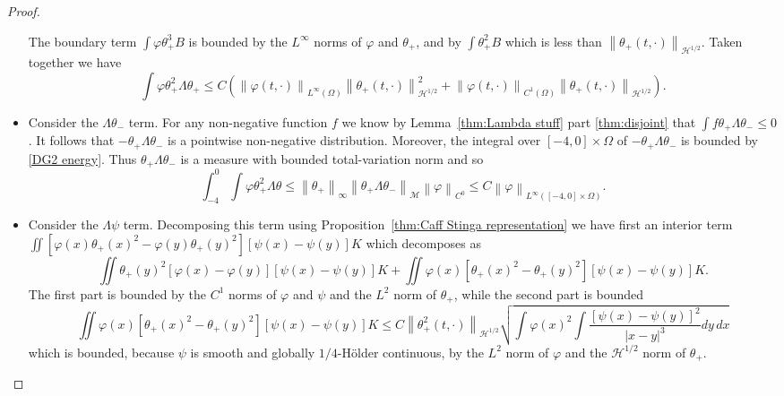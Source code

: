 \documentclass[11pt]{amsart}
\theoremstyle{remark}
\theoremstyle{definition}
\newcommand{\norm}[1]{\left\lVert#1\right\rVert}
\newcommand{\paren}[1]{\left( #1 \right)}
\newcommand{\HD}{\mathcal{H}}
\begin{document}
\begin{proof}
\begin{itemize}
The boundary term $\int \varphi \theta_+^3 B$ is bounded by the $L^\infty$ norms of $\varphi$ and $\theta_+$, and by $\int \theta_+^2 B$ which is less than $\norm{\theta_+(t,\cdot)}_{\HD^{1/2}}$.  Taken together we have
\[ \int \varphi \theta_+^2 \Lambda \theta_+ \leq C \paren{ \norm{\varphi(t,\cdot)}_{L^\infty(\Omega)} \norm{\theta_+(t,\cdot)}_{\HD^{1/2}}^2 + \norm{\varphi(t,\cdot)}_{C^1(\Omega)} \norm{\theta_+(t,\cdot)}_{\HD^{1/2}} }. \]

\item Consider the $\Lambda\theta_-$ term.  For any non-negative function $f$ we know by Lemma~\ref{thm:Lambda stuff} part \eqref{thm:disjoint} that $\int f \theta_+ \Lambda \theta_- \leq 0$.  
It follows that $-\theta_+ \Lambda \theta_-$ is a pointwise non-negative distribution.  Moreover, the integral over $[-4,0]\times\Omega$ of $-\theta_+\Lambda\theta_-$ is bounded by \eqref{DG2 energy}.  Thus $\theta_+\Lambda\theta_-$ is a measure with bounded total-variation norm and so
\[ \int_{-4}^0 \int \varphi \theta_+^2 \Lambda \theta \leq \norm{\theta_+}_\infty \norm{\theta_+\Lambda\theta_-}_{\mathcal{M}} \norm{\varphi}_{C^0} \leq C \norm{\varphi}_{L^\infty([-4,0]\times\Omega)}. \]

\item Consider the $\Lambda \psi$ term.  Decomposing this term using Proposition~\ref{thm:Caff Stinga representation} we have first an interior term $\iint [\varphi(x) \theta_+(x)^2 - \varphi(y) \theta_+(y)^2][\psi(x)-\psi(y)] K$ which decomposes as
\[ \iint \theta_+(y)^2[\varphi(x) - \varphi(y)][\psi(x)-\psi(y)] K + \iint \varphi(x) [\theta_+(x)^2 - \theta_+(y)^2][\psi(x)-\psi(y)] K. \]
The first part is bounded by the $C^1$ norms of $\varphi$ and $\psi$ and the $L^2$ norm of $\theta_+$, while the second part is bounded
\[ \iint \varphi(x) [\theta_+(x)^2 - \theta_+(y)^2][\psi(x)-\psi(y)] K \leq C \norm{\theta_+^2(t,\cdot)}_{\HD^{1/2}} \sqrt{ \int \varphi(x)^2 \int \frac{[\psi(x)-\psi(y)]^2}{|x-y|^3}dy \,dx} \]
which is bounded, because $\psi$ is smooth and globally $1/4$-H\"{o}lder continuous, by the $L^2$ norm of $\varphi$ and the $\HD^{1/2}$ norm of $\theta_+$.  


\end{itemize}
\end{proof}
\end{document}
